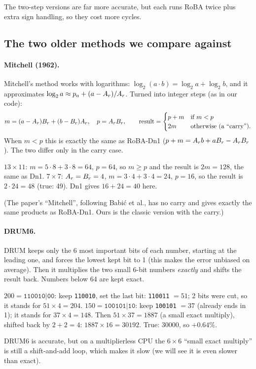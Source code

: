 The two-step versions are far more accurate, but each runs RoBA twice plus extra sign
handling, so they cost more cycles.

\subsection{The two older methods we compare against}

\paragraph{Mitchell (1962).} Mitchell's method works with logarithms: $\log_2(a\cdot b) =
\log_2 a + \log_2 b$, and it approximates $\log_2 a \approx p_a + (a-A_r)/A_r$. Turned into
integer steps (as in our code):
\[
  m = (a-A_r)B_r + (b-B_r)A_r,\quad p = A_rB_r,\qquad
  \text{result} = \begin{cases} p + m & \text{if } m < p\\ 2m & \text{otherwise (a ``carry'')}.\end{cases}
\]
When $m<p$ this is exactly the same as RoBA-Dn1 ($p+m = A_r b + aB_r - A_rB_r$). The two differ only
in the carry case.
\begin{example}[: Mitchell]
$13\times 11$: $m = 5\cdot 8 + 3\cdot 8 = 64$, $p=64$, so $m\ge p$ and the result is $2m=128$, the same
as Dn1. $7\times 7$: $A_r=B_r=4$, $m=3\cdot4+3\cdot4=24$, $p=16$, so the result is $2\cdot 24 = 48$
(true: 49). Dn1 gives $16+24=40$ here.
\end{example}
(The paper's ``Mitchell'', following Babi\'c et al., has no carry and gives exactly the same
products as RoBA-Dn1. Ours is the classic version with the carry.)

\paragraph{DRUM6.} DRUM keeps only the 6 most important bits of each number, starting at the
leading one, and forces the lowest kept bit to 1 (this makes the error unbiased on average). Then
it multiplies the two small 6-bit numbers \emph{exactly} and shifts the result back. Numbers below
64 are kept exact.
\begin{example}
$200 = \texttt{110010|00}$: keep \texttt{110010}, set the last bit: \texttt{110011} $=51$; 2 bits
were cut, so it stands for $51\times 4 = 204$.
$150 = \texttt{100101|10}$: keep \texttt{100101} $=37$ (already ends in 1); it stands for
$37\times 4 = 148$. Then $51\times 37 = 1887$ (a small exact multiply), shifted back by $2+2=4$:
$1887\times 16 = 30192$. True: 30000, so $+0.64\%$.
\end{example}
DRUM6 is accurate, but on a multiplierless CPU the $6\times6$ ``small exact multiply'' is still a
shift-and-add loop, which makes it slow (we will see it is even slower than exact).

